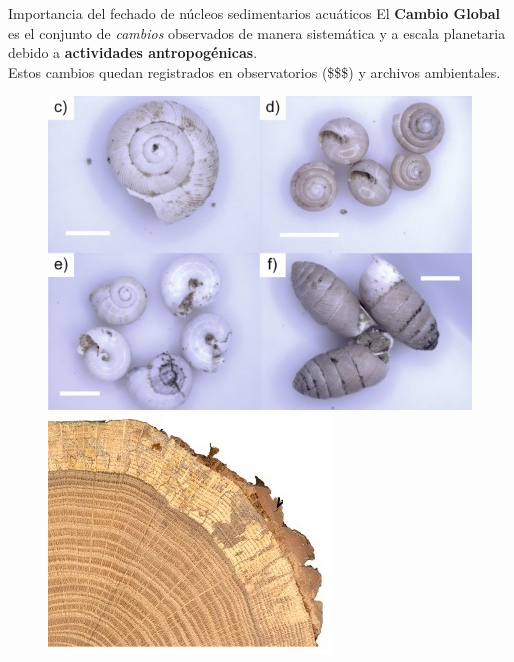 \documentclass[9pt]{beamer}
\begin{document}
\begin{frame}{Importancia del fechado de núcleos sedimentarios acuáticos}
\justifying El \textbf{Cambio Global} es el conjunto de \textit{cambios} observados de manera sistemática y a escala planetaria debido a \textbf{actividades antropogénicas}\footnotemark[1].
\\
Estos cambios quedan registrados en observatorios (\$\$\$) y archivos ambientales.
\begin{figure}
	\includegraphics[height=0.35\textheight]{Imagenes/CharcoalMollusc.jpg}
	\includegraphics[height=0.35\textheight]{Imagenes/Tree.jpg}

\end{figure}
\end{frame}
\end{document}

